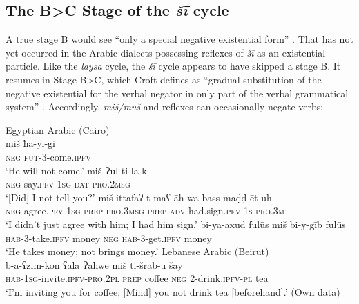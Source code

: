 \documentclass[output=paper]{langsci/langscibook}
\begin{document}
\subsection{The B>C Stage of the \textit{šī} cycle} \label{s:WiAR-3.4}

A true stage B would see “only a special negative existential form” \citep[9]{Croft1991}. That has not yet occurred in the Arabic dialects possessing reflexes of \textit{šī} as an existential particle. Like the \textit{laysa} cycle, the \textit{šī} cycle appears to have skipped a stage B. It resumes in Stage B>C, which Croft defines as “gradual substitution of the negative existential for the verbal negator in only part of the verbal grammatical system” \citeyearpar[10]{Croft1991}. Accordingly, \textit{miš/muš} and reflexes can occasionally negate verbs:

\ea Egyptian Arabic (Cairo) \label{ex:WiAR-18}\\
  \ea
  	\gll miš ħa-yi-gi\\
  	\textsc{neg} \textsc{fut-3}-come.\textsc{ipfv}\\
  	\glt ‘He will not come.’ \citep[87]{doss2008a}
  \ex
  	\gll miš Ɂul-ti la-k\\
  	\textsc{neg} say.\textsc{pfv-1sg} \textsc{dat-pro.2msg}\\
    \glt ‘[Did] I not tell you?’ \citep[87]{doss2008a}
  \ex
  	\gll miš ittafaʔ-t maʕ-āh wa-bass maḍḍ-ēt-uh\\
  	\textsc{neg} agree.\textsc{pfv-1sg} \textsc{prep-pro.3msg} \textsc{prep-adv} had.sign.\textsc{pfv-1s-pro.3m}\\
    \glt ‘I didn’t just agree with him; I had him sign.’ \citep[86]{doss2008a}
  \ex
  	\gll bi-ya-axud fulūs miš bi-y-gīb fulūs\\
  	\textsc{hab-3}-take.\textsc{ipfv} money \textsc{neg} \textsc{hab-3}-get.\textsc{ipfv} money\\
    \glt ‘He takes money; not brings money.’ \citep[248]{al-sayyed2017a}
  \ex Lebanese Arabic (Beirut)\\
  	\gll b-a-ʕzim-kon ʕalā Ɂahwe miš ti-šrab-ū šāy\\
  	\textsc{hab-1sg}-invite.\textsc{ipfv-pro.2pl} \textsc{prep} coffee \textsc{neg} 2-drink.\textsc{ipfv-pl} tea\\
  	\glt ‘I’m inviting you for coffee; [Mind] you not drink tea [beforehand].’ (Own data)
\z \z
\end{document}
